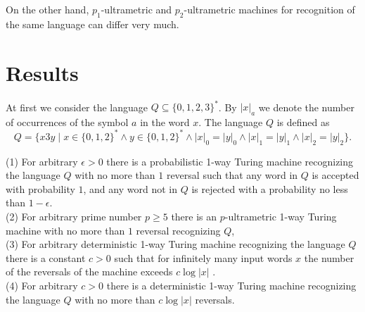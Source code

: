 \documentclass{llncs}
\begin{document}
On the other hand, $p_1$-ultrametric and $p_2$-ultrametric machines for recognition of the same language can differ very much. 







\section{Results} 

At first we consider the language $Q \subseteq \{0,1,2,3\}^*$. By $|x|_a$ we denote the number of occurrences of the symbol $a$ in the word $x$.
The language $Q$ is defined as
$$
Q = \{ x3y \mid x \in \{0,1,2\}^* \wedge  y \in \{0,1,2\}^* \wedge  |x|_0 = |y|_0  \wedge |x|_1 = |y|_1 \wedge  |x|_2 = |y|_2 \}.
$$










\begin{theorem}
\label{Th7a}
(1) For arbitrary $\epsilon > 0$  there is a probabilistic 1-way Turing machine recognizing the language $Q$  with no more than $1$ reversal such that any word in $Q$ is accepted with probability $1$, 
and any word not in $Q$ is rejected with a probability no less than $1 - \epsilon $.\\
(2) For arbitrary prime number $p \geq 5$ there is an $p$-ultrametric 1-way Turing machine with no more than $1$ reversal recognizing $Q$,\\
(3) For arbitrary deterministic 1-way Turing machine recognizing the language $Q$  there is a constant $c > 0$ such that for infinitely many input words $x$ the number of the reversals of the machine 
exceeds $c \log |x|$ .\\
 (4) For arbitrary $c > 0$  there is a deterministic 1-way Turing machine recognizing the language $Q$ with no more than $c \log |x|$  reversals.
\end{theorem}
\end{document}
